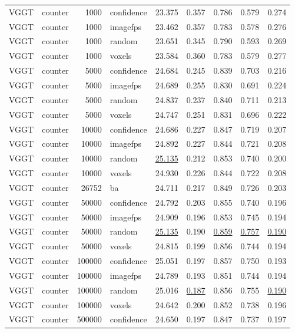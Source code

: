 \begin{table}[H]
\begin{tabular}{llrlrrrrr}
VGGT & counter & 1000 & confidence & 23.375 & 0.357 & 0.786 & 0.579 & 0.274 \\
VGGT & counter & 1000 & imagefps & 23.462 & 0.357 & 0.783 & 0.578 & 0.276 \\
VGGT & counter & 1000 & random & 23.651 & 0.345 & 0.790 & 0.593 & 0.269 \\
VGGT & counter & 1000 & voxels & 23.584 & 0.360 & 0.783 & 0.579 & 0.277 \\
VGGT & counter & 5000 & confidence & 24.684 & 0.245 & 0.839 & 0.703 & 0.216 \\
VGGT & counter & 5000 & imagefps & 24.689 & 0.255 & 0.830 & 0.691 & 0.224 \\
VGGT & counter & 5000 & random & 24.837 & 0.237 & 0.840 & 0.711 & 0.213 \\
VGGT & counter & 5000 & voxels & 24.747 & 0.251 & 0.831 & 0.696 & 0.222 \\
VGGT & counter & 10000 & confidence & 24.686 & 0.227 & 0.847 & 0.719 & 0.207 \\
VGGT & counter & 10000 & imagefps & 24.892 & 0.227 & 0.844 & 0.721 & 0.208 \\
VGGT & counter & 10000 & random & \underline{25.135} & 0.212 & 0.853 & 0.740 & 0.200 \\
VGGT & counter & 10000 & voxels & 24.930 & 0.226 & 0.844 & 0.722 & 0.208 \\
VGGT & counter & 26752 & ba & 24.711 & 0.217 & 0.849 & 0.726 & 0.203 \\
VGGT & counter & 50000 & confidence & 24.792 & 0.203 & 0.855 & 0.740 & 0.196 \\
VGGT & counter & 50000 & imagefps & 24.909 & 0.196 & 0.853 & 0.745 & 0.194 \\
VGGT & counter & 50000 & random & \underline{25.135} & 0.190 & \underline{0.859} & \underline{0.757} & \underline{0.190} \\
VGGT & counter & 50000 & voxels & 24.815 & 0.199 & 0.856 & 0.744 & 0.194 \\
VGGT & counter & 100000 & confidence & 25.051 & 0.197 & 0.857 & 0.750 & 0.193 \\
VGGT & counter & 100000 & imagefps & 24.789 & 0.193 & 0.851 & 0.744 & 0.194 \\
VGGT & counter & 100000 & random & 25.016 & \underline{0.187} & 0.856 & 0.755 & \underline{0.190} \\
VGGT & counter & 100000 & voxels & 24.642 & 0.200 & 0.852 & 0.738 & 0.196 \\
VGGT & counter & 500000 & confidence & 24.650 & 0.197 & 0.847 & 0.737 & 0.197 \\

\end{tabular}
\end{table}
